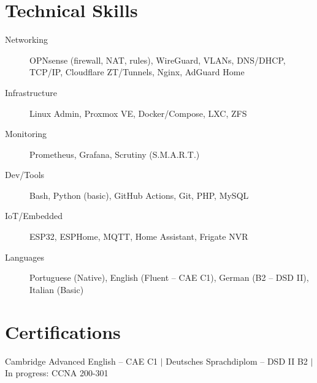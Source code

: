 \documentclass[10.5pt]{article}
\begin{document}
\section{Technical Skills}
\begin{description}
    \item[Networking] OPNsense (firewall, NAT, rules), WireGuard, VLANs, DNS/DHCP, TCP/IP, Cloudflare ZT/Tunnels, Nginx, AdGuard Home
    \item[Infrastructure] Linux Admin, Proxmox VE, Docker/Compose, LXC, ZFS
    \item[Monitoring] Prometheus, Grafana, Scrutiny (S.M.A.R.T.)
    \item[Dev/Tools] Bash, Python (basic), GitHub Actions, Git, PHP, MySQL
    \item[IoT/Embedded] ESP32, ESPHome, MQTT, Home Assistant, Frigate NVR
    \item[Languages] Portuguese (Native), English (Fluent -- CAE C1), German (B2 -- DSD II), Italian (Basic)
\end{description}

\section{Certifications}
Cambridge Advanced English -- CAE C1 $|$ Deutsches Sprachdiplom -- DSD II B2 $|$ In progress: CCNA 200-301
\end{document}
